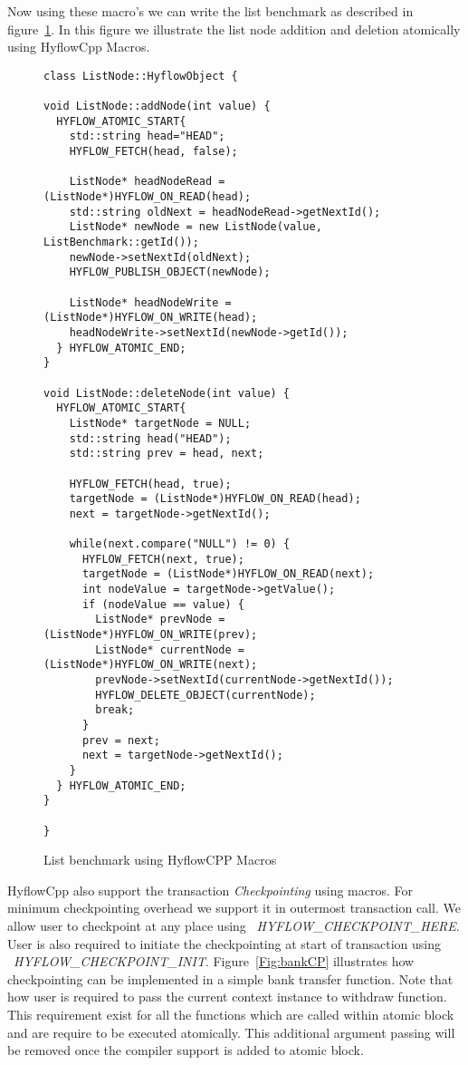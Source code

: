 \documentclass[12pt,english]{report}
\begin{document}
Now using these macro's we can write the list benchmark as described in figure~\ref{Fig:listMacro}. In this figure we illustrate the list node addition and deletion atomically using HyflowCpp Macros. 
\begin{figure}
\centering
\begin{lstlisting}
class ListNode::HyflowObject {

void ListNode::addNode(int value) {
  HYFLOW_ATOMIC_START{
	std::string head="HEAD";
	HYFLOW_FETCH(head, false);

	ListNode* headNodeRead =  (ListNode*)HYFLOW_ON_READ(head);
	std::string oldNext = headNodeRead->getNextId();
	ListNode* newNode = new ListNode(value, ListBenchmark::getId());
	newNode->setNextId(oldNext);
	HYFLOW_PUBLISH_OBJECT(newNode);

	ListNode* headNodeWrite = (ListNode*)HYFLOW_ON_WRITE(head);
	headNodeWrite->setNextId(newNode->getId());
  } HYFLOW_ATOMIC_END;
}

void ListNode::deleteNode(int value) {
  HYFLOW_ATOMIC_START{
	ListNode* targetNode = NULL;
	std::string head("HEAD");
	std::string prev = head, next;

	HYFLOW_FETCH(head, true);
	targetNode = (ListNode*)HYFLOW_ON_READ(head);
	next = targetNode->getNextId();

	while(next.compare("NULL") != 0) {
	  HYFLOW_FETCH(next, true);
	  targetNode = (ListNode*)HYFLOW_ON_READ(next);
	  int nodeValue = targetNode->getValue();
	  if (nodeValue == value) {
		ListNode* prevNode = (ListNode*)HYFLOW_ON_WRITE(prev);
		ListNode* currentNode = (ListNode*)HYFLOW_ON_WRITE(next);
		prevNode->setNextId(currentNode->getNextId());
		HYFLOW_DELETE_OBJECT(currentNode);
		break;
	  }
	  prev = next;
	  next = targetNode->getNextId();
	}
  } HYFLOW_ATOMIC_END;
}

}
\end{lstlisting}
\caption{List benchmark using HyflowCPP Macros}
\label{Fig:listMacro}
\end{figure}

HyflowCpp also support the transaction \emph{Checkpointing} using macros. For minimum checkpointing overhead we support it in outermost transaction call. We allow user to checkpoint at any place using ~\emph{HYFLOW{\_}CHECKPOINT{\_}HERE}. User is also required to initiate the checkpointing at start of transaction using ~\emph{HYFLOW{\_}CHECKPOINT{\_}INIT}. Figure~\ref{Fig:bankCP} illustrates how checkpointing can be implemented in a simple bank transfer function. Note that how user is required to pass the current context instance to withdraw function. This requirement exist for all the functions which are called within atomic block and are require to be executed atomically. This additional argument passing will be removed once the compiler support is added to atomic block. 
\end{document}
